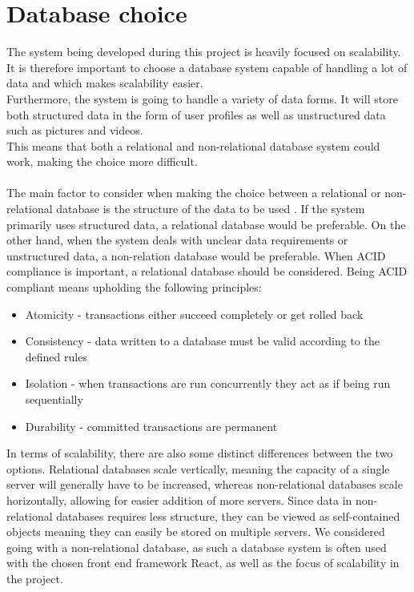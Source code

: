 \section{Database choice}
The system being developed during this project is heavily focused on scalability.
It is therefore important to choose a database system capable of handling a lot of data and which makes scalability easier.
\\
Furthermore, the system is going to handle a variety of data forms. It will store both structured data in the form of user profiles as well as unstructured data such as pictures and videos.
\\
This means that both a relational and non-relational database system could work, making the choice more difficult.
\\\\
The main factor to consider when making the choice between a relational or non-relational database is the structure of the data to be used \cite{sqlvsnosql}.
If the system primarily uses structured data, a relational database would be preferable.
On the other hand, when the system deals with unclear data requirements or unstructured data, a non-relation database would be preferable. 
When ACID compliance is important, a relational database should be considered.
Being ACID compliant means upholding the following principles\cite{sqlvsnosql}:
\begin{itemize}
    \item Atomicity - transactions either succeed completely or get rolled back
    \item Consistency - data written to a database must be valid according to the defined rules
    \item Isolation - when transactions are run concurrently they act as if being run sequentially
    \item Durability - committed transactions are permanent 
\end{itemize}
In terms of scalability, there are also some distinct differences between the two options. 
Relational databases scale vertically, meaning the capacity of a single server will generally have to be increased, whereas non-relational databases scale horizontally, allowing for easier addition of more servers.
Since data in non-relational databases requires less structure, they can be viewed as self-contained objects meaning they can easily be stored on multiple servers.
We considered going with a non-relational database, as such a database system is often used with the chosen front end framework React, as well as the focus of scalability in the project.
